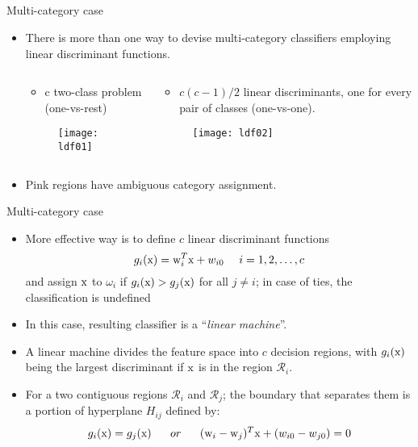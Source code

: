 \subsection{}
\begin{frame}{Multi-category case}
\begin{itemize}
\item There is more than one way to devise multi-category classifiers employing linear discriminant functions.
\begin{columns}
\begin{column}{4cm}
\begin{itemize}
\item c two-class problem ({\color{mycolor1}one-vs-rest})
\end{itemize}
\begin{figure}
\texttt{[image: ldf01]}
\end{figure}
\end{column}
\begin{column}{5cm}
\begin{itemize}
\item $c(c-1)/2$ linear discriminants, one for every pair of classes ({\color{mycolor1}one-vs-one}).
\end{itemize}
\begin{figure}
\texttt{[image: ldf02]}
\end{figure}
\end{column}
\end{columns}

\item Pink regions have ambiguous category assignment.
\end{itemize}
\end{frame}

\begin{frame}{Multi-category case}
\begin{itemize}
\item More effective way is to define $c$ linear discriminant functions
\begin{equation}
g_i({\rm x})={\rm w}^T_i{\rm x}+w_{i0}~~~~i=1,2,\ldots,c \nonumber
\end{equation}
	and assign ${\rm x}$ to $\omega_i$ if $g_i({\rm x}) > g_j({\rm x})$ for all $j\neq i$; in case of ties, the classification is undefined
\item In this case, resulting classifier is a ``\textit{\color{mycolor2}linear machine}''.
\item A linear machine divides the feature space into $c$ decision regions, with $g_i({\rm x})$ being the largest discriminant if ${\rm x}$ is in the region $\mathcal{R}_i$.
\item For a two contiguous regions $\mathcal{R}_i$ and $\mathcal{R}_j$; the boundary that separates them is a portion of hyperplane $H_{ij}$ defined by:
\begin{equation}
g_i({\rm x})=g_j({\rm x})~~~~~or~~~~~({\rm w}_i-{\rm w}_j)^T{\rm x}+(w_{i0}-w_{j0})=0 \nonumber
\end{equation}
\end{itemize}
\end{frame}

